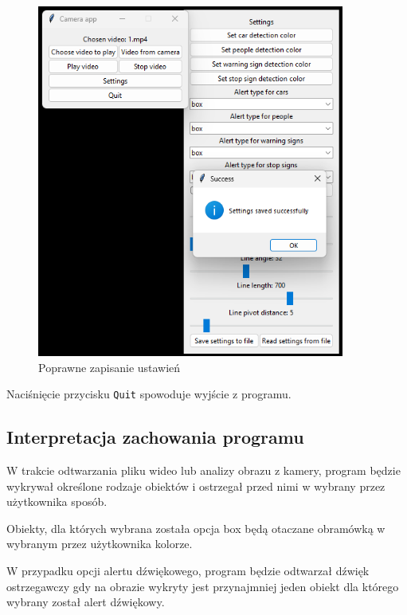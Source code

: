 \begin{figure}[H]
	\centering
	\includegraphics[width=0.9\textwidth]{Img/manual/settings_saved.png}
	\caption{Poprawne zapisanie ustawień}
	\label{fig:settings_saved}
\end{figure}

Naciśnięcie przycisku \verb|Quit| spowoduje wyjście z programu.

\subsection{Interpretacja zachowania programu}

W trakcie odtwarzania pliku wideo lub analizy obrazu z kamery, program będzie wykrywał określone rodzaje obiektów i ostrzegał przed nimi w wybrany przez użytkownika sposób.

Obiekty, dla których wybrana została opcja box będą otaczane obramówką w wybranym przez użytkownika kolorze.

W przypadku opcji alertu dźwiękowego, program będzie odtwarzał dźwięk ostrzegawczy gdy na obrazie wykryty jest przynajmniej jeden obiekt dla którego wybrany został alert dźwiękowy.




